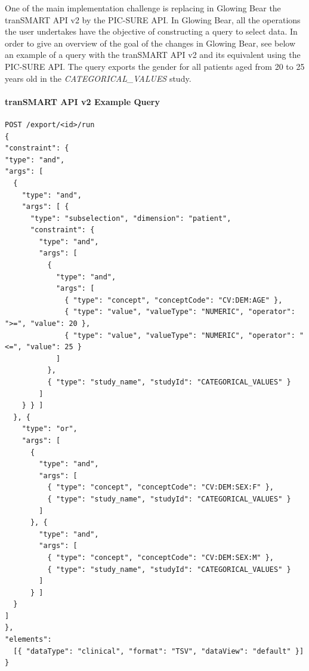 One of the main implementation challenge is replacing in Glowing Bear the tranSMART API v2 by the PIC-SURE API.
In Glowing Bear, all the operations the user undertakes have the objective of constructing a query to select data.
In order to give an overview of the goal of the changes in Glowing Bear, see below an example of a query with the tranSMART API v2 and its equivalent using the PIC-SURE API.
The query exports the gender for all patients aged from 20 to 25 years old in the \emph{CATEGORICAL\_VALUES} study.

\newpage
\paragraph*{tranSMART API v2 Example Query}
\begin{verbatim}
POST /export/<id>/run
{
"constraint": {
"type": "and",
"args": [
  {
    "type": "and",
    "args": [ {
      "type": "subselection", "dimension": "patient",
      "constraint": {
        "type": "and",
        "args": [
          {
            "type": "and",
            "args": [
              { "type": "concept", "conceptCode": "CV:DEM:AGE" },
              { "type": "value", "valueType": "NUMERIC", "operator": ">=", "value": 20 },
              { "type": "value", "valueType": "NUMERIC", "operator": "<=", "value": 25 }
            ]
          },
          { "type": "study_name", "studyId": "CATEGORICAL_VALUES" }
        ]
    } } ]
  }, {
    "type": "or",
    "args": [
      {
        "type": "and",
        "args": [
          { "type": "concept", "conceptCode": "CV:DEM:SEX:F" },
          { "type": "study_name", "studyId": "CATEGORICAL_VALUES" }
        ]
      }, {
        "type": "and",
        "args": [
          { "type": "concept", "conceptCode": "CV:DEM:SEX:M" },
          { "type": "study_name", "studyId": "CATEGORICAL_VALUES" }
        ]
      } ]
  }
]
},
"elements": 
  [{ "dataType": "clinical", "format": "TSV", "dataView": "default" }]
}
\end{verbatim}

\newpage
